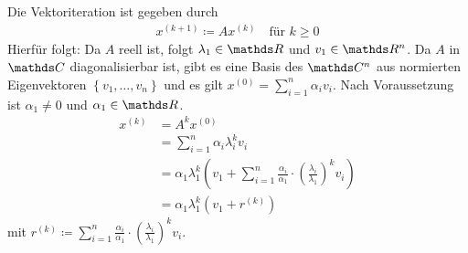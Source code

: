 \label{8.2.2}
Die Vektoriteration ist gegeben durch
\begin{gather}
  x^{(k+1)} \coloneqq Ax^{(k)} \quad \text{für } k\geq 0
  \label{VIII.2.1}
\end{gather}
Hierfür folgt:
Da $A$ reell ist, folgt $\lambda_1\in \R$ und $v_1\in\R^n$.
Da $A$ in $\C$ diagonalisierbar ist,
gibt es eine Basis des $\C^n$ aus
normierten Eigenvektoren $\left\{v_1,\ldots,v_n\right\}$
und es gilt $x^{(0)}= \sum_{i=1}^{n} \alpha_iv_i$.
Nach Voraussetzung ist $\alpha_1\neq 0$ und $\alpha_1\in\R$.
\begin{align}\nonumber
  x^{(k)} &= A^kx^{(0)} \\\nonumber
          &= \sum_{i=1}^{n} \alpha_i\lambda_i^kv_i\\\nonumber
          &= \alpha_1\lambda_1^k\left(
            v_1+\sum_{i=1}^{n}\frac{\alpha_i}{\alpha_1}
            \cdot \left(\frac{\lambda_i}{\lambda_1}\right)^kv_i
            \right)\\
          &= \alpha_1\lambda_1^k\left( v_1+r^{(k)}  \right)
\label{VIII.2.2}
\end{align}
mit $r^{(k)}\coloneqq \sum_{i=1}^{n}\frac{\alpha_i}{\alpha_1}
            \cdot \left(\frac{\lambda_i}{\lambda_1}\right)^kv_i$.

